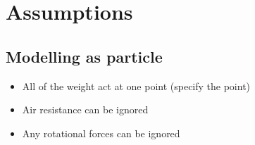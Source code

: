 \section{Assumptions}
\subsection{Modelling as particle}
\begin{itemize}
    \item All of the weight act at one point (specify the point)
    \item Air resistance can be ignored
    \item Any rotational forces can be ignored
\end{itemize}

